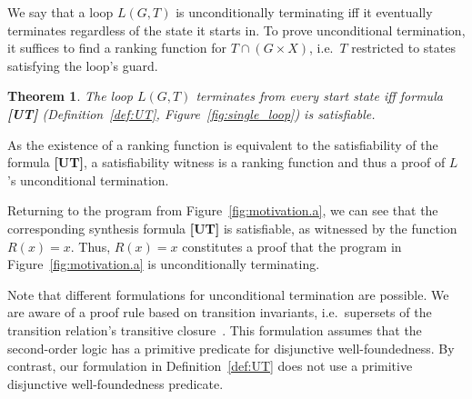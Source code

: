 \documentclass[preprint]{sigplanconf}
\newtheorem{theorem}{Theorem}
\theoremstyle{definition}
\begin{document}
We say that a loop $L(G, T)$ is unconditionally terminating iff it eventually
terminates regardless of the state it starts in. To prove unconditional termination, it suffices
to find a ranking function for \mbox{$T \cap (G \times X)$}, i.e.~$T$ restricted to states satisfying the loop's guard.


\begin{theorem}
\label{thm:ut}
 The loop $L(G, T)$ terminates from every start state iff formula {\bf [UT]} (Definition~\ref{def:UT}, Figure~\ref{fig:single_loop}) is satisfiable.
\end{theorem}

% 

As the existence of a ranking function is equivalent to the satisfiability
of the formula {\bf [UT]}, a satisfiability witness is a ranking
function and thus a proof of $L$'s unconditional termination.

Returning to the program from Figure~\ref{fig:motivation.a}, we
can see that the corresponding synthesis formula {\bf [UT]} is satisfiable,
as witnessed by the function $R(x) = x$.  Thus, $R(x) = x$ constitutes a
proof that the program in Figure~\ref{fig:motivation.a} is unconditionally
terminating.

Note that different formulations for unconditional termination are possible. 
We are aware of a proof rule based on transition invariants, i.e.~supersets
of the transition relation's transitive
closure~\cite{DBLP:conf/pldi/GrebenshchikovLPR12}.  This formulation assumes
that the second-order logic has a primitive predicate for disjunctive
well-foundedness.  By contrast, our formulation in Definition~\ref{def:UT}
does not use a primitive disjunctive well-foundedness predicate.  \\
\end{document}

